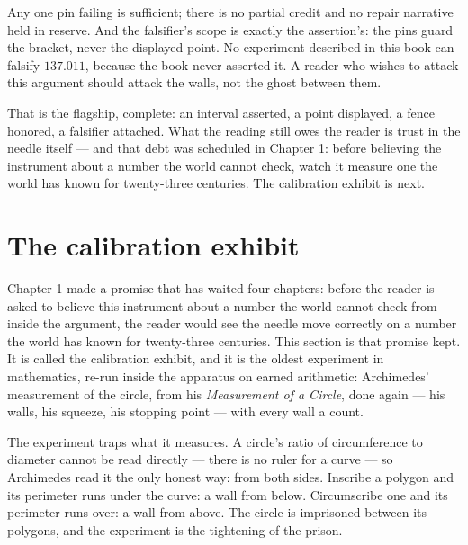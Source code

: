 Any one pin failing is sufficient; there is no partial credit and no repair
narrative held in reserve. And the falsifier's scope is exactly the assertion's:
the pins guard the bracket, never the displayed point. No experiment described in
this book can falsify $137.011$, because the book never asserted it. A reader who
wishes to attack this argument should attack the walls, not the ghost between
them.

That is the flagship, complete: an interval asserted, a point displayed, a fence
honored, a falsifier attached. What the reading still owes the reader is trust in
the needle itself --- and that debt was scheduled in Chapter 1: before believing
the instrument about a number the world cannot check, watch it measure one the
world has known for twenty-three centuries. The calibration exhibit is next.

\section{The calibration exhibit}

Chapter 1 made a promise that has waited four chapters: before the reader is asked to
believe this instrument about a number the world cannot check from inside the
argument, the reader would see the needle move correctly on a number the world has
known for twenty-three centuries. This section is that promise kept. It is called the
calibration exhibit, and it is the oldest experiment in mathematics, re-run inside
the apparatus on earned arithmetic: Archimedes' measurement of the circle, from his
\emph{Measurement of a Circle}, done again --- his walls, his squeeze, his stopping
point --- with every wall a count.

The experiment traps what it measures. A circle's ratio of circumference to diameter
cannot be read directly --- there is no ruler for a curve --- so Archimedes read it
the only honest way: from both sides. Inscribe a polygon and its perimeter runs
under the curve: a wall from below. Circumscribe one and its perimeter runs over: a
wall from above. The circle is imprisoned between its polygons, and the experiment
is the tightening of the prison.

